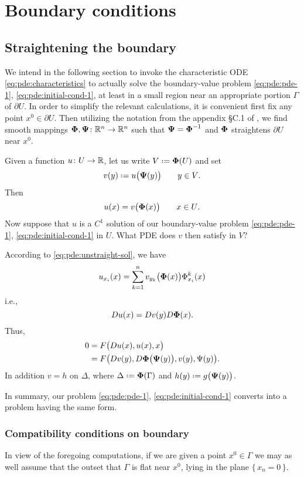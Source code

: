 \section{Boundary conditions}
\subsection{Straightening the boundary}
We intend in the following section to invoke the characteristic ODE
\eqref{eq:pde:characteristics} to actually solve the boundary-value problem
\eqref{eq:pde:pde-1}, \eqref{eq:pde:initial-cond-1}, at least in a small
region near an appropriate portion \(\Gamma\) of \(\partial U\). In order
to simplify the relevant calculations, it is convenient first fix any point
\(x^0\in\partial U\). Then utilizing the notation from the appendix \S C.1
of \cite{evans}, we find smooth mappings
\({\boldsymbol\Phi},{\boldsymbol\Psi}\colon\mathbb{R}^n\to\mathbb{R}^n\) such that \({\boldsymbol\Psi}={\boldsymbol\Phi}^{-1}\) and
\({\boldsymbol\Phi}\) straightens \(\partial U\) near \(x^0\).

Given a function \(u\colon U\to\mathbb{R}\), let us write \(V\defeq\bfPhi(U)\)
and set
\begin{equation}
  \label{eq:pde:straight-sol}
  v(y)\defeq u\bigl( \bfPsi(y) \bigr)\qquad\text{\(y\in V\).}
\end{equation}
Then
\begin{equation}
  \label{eq:pde:unstraight-sol}
  u(x)=v\bigl( {\boldsymbol\Phi}(x) \bigr)\qquad\text{\(x\in U\)}.
\end{equation}
Now suppose that \(u\) is a \(C^1\) solution of our boundary-value problem
\eqref{eq:pde:pde-1}, \eqref{eq:pde:initial-cond-1} in \(U\). What PDE does
\(v\) then satisfy in \(V\)?

According to \eqref{eq:pde:unstraight-sol}, we have
\[
  u_{x_i}(x)=\sum_{k=1}^n v_{y_k}\bigl( {\boldsymbol\Phi}(x) \bigr)\Phi_{x_i}^k(x)
\]
i.e.,
\[
  Du(x)=Dv(y)D{\boldsymbol\Phi}(x).
\]
Thus,
\begin{align*}
  0&=F\bigl(Du(x),u(x),x\bigr)\\
   &=F\bigl( Dv(y),D{\boldsymbol\Phi}\bigl({\boldsymbol\Psi}(y)\bigr),v(y),\Psi(y) \bigr).
\end{align*}
In addition \(v=h\) on \(\Delta\), where \(\Delta\defeq\bfPhi(\Gamma)\) and
\(h(y)\defeq g\bigl(\bfPsi(y)\bigr)\).

In summary, our problem \eqref{eq:pde:pde-1}, \eqref{eq:pde:initial-cond-1}
converts into a problem having the same form.

\subsubsection{Compatibility conditions on boundary}
In view of the foregoing computations, if we are given a point
\(x^0\in\Gamma\) we may as well assume that the outset that \(\Gamma\) is
flat near \(x^0\), lying in the plane \(\{\,x_n=0\,\}\).


